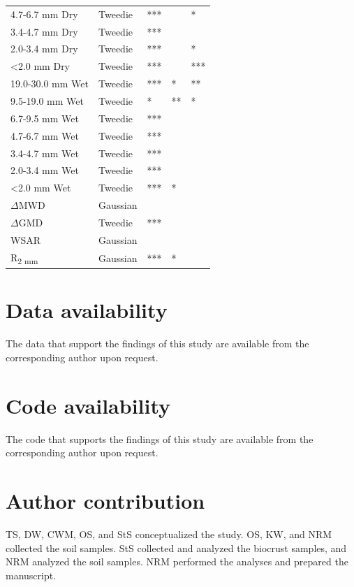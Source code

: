 \begin{table}[htbp]
\begin{tabular}{@{}lllll@{}}
4.7-6.7 mm Dry	& Tweedie	& ***	& 	& * \\
3.4-4.7 mm Dry	& Tweedie	& ***	& 	&  \\
2.0-3.4 mm Dry	& Tweedie	& ***	& 	& * \\
\textless2.0 mm Dry	& Tweedie	& ***	& 	& *** \\ %
19.0-30.0 mm Wet	& Tweedie	& ***	& *	& ** \\
9.5-19.0 mm Wet	& Tweedie	& *	& **	& * \\
6.7-9.5 mm Wet	& Tweedie	& ***	& 	&  \\
4.7-6.7 mm Wet	& Tweedie	& ***	& 	&  \\
3.4-4.7 mm Wet	& Tweedie	& ***	& 	&  \\
2.0-3.4 mm Wet	& Tweedie	& ***	& 	&  \\
\textless2.0 mm Wet	& Tweedie	& ***	& *	&  \\ %
$\Delta$MWD	& Gaussian	& 	& 	&  \\ %
$\Delta$GMD	& Tweedie	& ***	& 	&  \\ %
WSAR	& Gaussian	& 	& 	&  \\
R\textsubscript{2 mm}	& Gaussian	& ***	& *	&  \\ %
\bottomrule
\end{tabular}
\end{table}

\FloatBarrier

\section*{Data availability}

The data that support the findings of this study are available from the corresponding author upon request.

\section*{Code availability}

The code that supports the findings of this study are available from the corresponding author upon request.

\section*{Author contribution}

TS, DW, CWM, OS, and StS conceptualized the study. OS, KW, and NRM collected the soil samples. StS collected and analyzed the biocrust samples, and NRM analyzed the soil samples. NRM performed the analyses and prepared the manuscript.

